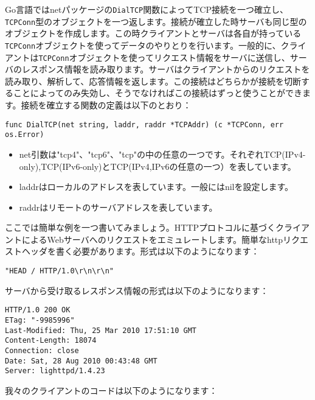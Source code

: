 Go言語ではnetパッケージの\texttt{DialTCP}関数によってTCP接続を一つ確立し、\texttt{TCPConn}型のオブジェクトを一つ返します。接続が確立した時サーバも同じ型のオブジェクトを作成します。この時クライアントとサーバは各自が持っている\texttt{TCPConn}オブジェクトを使ってデータのやりとりを行います。一般的に、クライアントは\texttt{TCPConn}オブジェクトを使ってリクエスト情報をサーバに送信し、サーバのレスポンス情報を読み取ります。サーバはクライアントからのリクエストを読み取り、解析して、応答情報を返します。この接続はどちらかが接続を切断することによってのみ失効し、そうでなければこの接続はずっと使うことができます。接続を確立する関数の定義は以下のとおり：

\begin{lstlisting}[numbers=none]
func DialTCP(net string, laddr, raddr *TCPAddr) (c *TCPConn, err os.Error)
\end{lstlisting}

\begin{itemize}
  \item net引数は"tcp4"、"tcp6"、"tcp"の中の任意の一つです。それぞれTCP(IPv4-only),TCP(IPv6-only)とTCP(IPv4,IPv6の任意の一つ）を表しています。
  \item laddrはローカルのアドレスを表しています。一般にはnilを設定します。
  \item raddrはリモートのサーバアドレスを表しています。
\end{itemize}

ここでは簡単な例を一つ書いてみましょう。HTTPプロトコルに基づくクライアントによるWebサーバへのリクエストをエミュレートします。簡単なhttpリクエストヘッダを書く必要があります。形式は以下のようになります：

\begin{lstlisting}[numbers=none]
"HEAD / HTTP/1.0\r\n\r\n"
\end{lstlisting}

サーバから受け取るレスポンス情報の形式は以下のようになります：

\begin{lstlisting}[numbers=none]
HTTP/1.0 200 OK
ETag: "-9985996"
Last-Modified: Thu, 25 Mar 2010 17:51:10 GMT
Content-Length: 18074
Connection: close
Date: Sat, 28 Aug 2010 00:43:48 GMT
Server: lighttpd/1.4.23
\end{lstlisting}

我々のクライアントのコードは以下のようになります：

